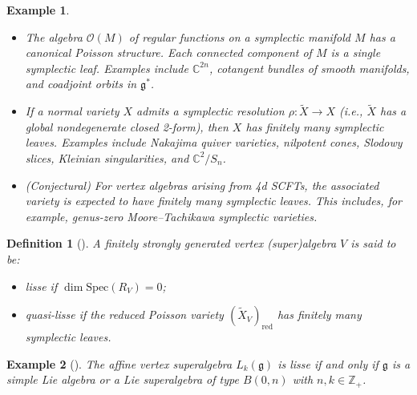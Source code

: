 \documentclass[9pt]{amsart}
\newtheorem{definition}{Definition}[section]
\newtheorem{example}{Example}[section]
\begin{document}
\begin{example}
\begin{itemize}
    \item[\cite{chriss1997representation}] The algebra $\mathcal{O}(M)$ of regular functions on a symplectic manifold $M$ has a canonical Poisson structure. Each connected component of $M$ is a single symplectic leaf. Examples include $\mathbb{C}^{2n}$, cotangent bundles of smooth manifolds, and coadjoint orbits in $\mathfrak{g}^*$.
    \item[\cite{etingof2018poisson}] If a normal variety $X$ admits a symplectic resolution $\rho: \tilde{X} \rightarrow X$ (i.e., $\tilde{X}$ has a global nondegenerate closed 2-form), then $X$ has finitely many symplectic leaves. Examples include Nakajima quiver varieties, nilpotent cones, Slodowy slices, Kleinian singularities, and $\mathbb{C}^2/S_n$.
    \item (Conjectural) For vertex algebras arising from 4d SCFTs, the associated variety is expected to have finitely many symplectic leaves. This includes, for example, genus-zero Moore–Tachikawa symplectic varieties.
\end{itemize}
\end{example}

\begin{definition}[\cite{arakawa2012remark, arakawa2018quasi}]
A finitely strongly generated vertex (super)algebra $V$ is said to be:
\begin{itemize}
    \item \emph{lisse} if $\dim \mathrm{Spec}(R_V) = 0$;
    \item \emph{quasi-lisse} if the reduced Poisson variety $(\tilde{X}_V)_{\mathrm{red}}$ has finitely many symplectic leaves. %
\end{itemize}
\end{definition}

\begin{example}[\cite{gorelik2007simplicity}]
The affine vertex superalgebra $L_k(\mathfrak{g})$ is lisse if and only if $\mathfrak{g}$ is a simple Lie algebra or a Lie superalgebra of type $B(0,n)$ with $n, k \in \mathbb{Z}_{+}$.
\end{example}
\end{document}
